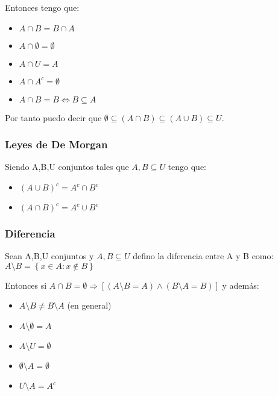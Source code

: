 \documentclass{article}
\begin{document}
Entonces tengo que: \begin{itemize}
    \item $A \cap B = B \cap A$
    \item $A \cap \emptyset = \emptyset$
    \item $A \cap U = A$
    \item $A \cap A^c=\emptyset$
    \item $A \cap B = B \iff B \subseteq A$
\end{itemize} 

Por tanto puedo decir que \begin{math}
    \emptyset \subseteq (A \cap B) \subseteq (A \cup B) \subseteq U 
\end{math}.
\subsubsection{Leyes de De Morgan}
Siendo A,B,U conjuntos tales que $A,B \subseteq U$ tengo que: \begin{itemize}
    \item \begin{math}
        (A \cup B)^c = A^c \cap B^c
    \end{math}
    \item \begin{math}
        (A \cap B)^c = A^c \cup B^c
    \end{math}
\end{itemize}
\subsubsection{Diferencia}
Sean A,B,U conjuntos y $A,B \subseteq U$ defino la diferencia entre A y B como: \begin{math}
    A \setminus B = \left\{x\in A: x \notin B\right\}
\end{math}

Entonces si $A \cap B = \emptyset \Rightarrow [(A \setminus B = A) \land (B \setminus A = B)]$ y además: \begin{itemize}
    \item $A \setminus B \neq B \setminus A$ (en general)
    \item $A \setminus \emptyset = A$
    \item $A \setminus U = \emptyset$
    \item $\emptyset \setminus A = \emptyset$
    \item $U \setminus A = A^c$
\end{itemize} 
\end{document}
